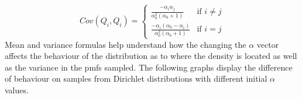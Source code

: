 \documentclass[twoside,hidelinks]{article}
\begin{document}
\begin{equation}
 Cov(Q_i,Q_i) =
\left\{
	\begin{array}{ll}
		\frac{ - \alpha_i \alpha_j }{ \alpha_0^2 ( \alpha_0+1) }                   & \mbox{if } i \neq j  \\
		\frac{ - \alpha_i ( \alpha_0 - \alpha_i) }{ \alpha_0^2 ( \alpha_0+1)} & \mbox{if } i=j
	\end{array}
\right.
\end{equation}
Mean and variance formulas help understand how the changing the $ \alpha $ vector affects the behaviour of the distribution as to where the density is located as well as the variance in the pmfs sampled. The following graphs display the difference of behaviour on samples from Dirichlet distributions with different initial $\alpha$ values.
\end{document}
